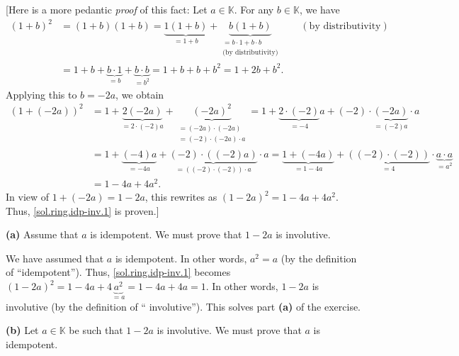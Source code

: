 \documentclass[paper=a4, fontsize=12pt]{scrartcl}%
\theoremstyle{plainsl}
\theoremstyle{definition}
\theoremstyle{remark}
\begin{document}
[Here is a more pedantic \textit{proof} of this fact: Let $a\in\mathbb{K}$.
For any $b\in\mathbb{K}$, we have%
\begin{align*}
\left(  1+b\right)  ^{2}  &  =\left(  1+b\right)  \left(  1+b\right)
=\underbrace{1\left(  1+b\right)  }_{=1+b}+\underbrace{b\left(  1+b\right)
}_{\substack{=b\cdot1+b\cdot b\\\text{(by distributivity)}}}\qquad\left(
\text{by distributivity}\right) \\
&  =1+b+\underbrace{b\cdot1}_{=b}+\underbrace{b\cdot b}_{=b^{2}}%
=1+b+b+b^{2}=1+2b+b^{2}.
\end{align*}
Applying this to $b=-2a$, we obtain%
\begin{align*}
\left(  1+\left(  -2a\right)  \right)  ^{2}  &  =1+\underbrace{2\left(
-2a\right)  }_{=2\cdot\left(  -2\right)  a}+\underbrace{\left(  -2a\right)
^{2}}_{\substack{=\left(  -2a\right)  \cdot\left(  -2a\right)  \\=\left(
-2\right)  \cdot\left(  -2a\right)  \cdot a}}=1+\underbrace{2\cdot\left(
-2\right)  }_{=-4}a+\left(  -2\right)  \cdot\underbrace{\left(  -2a\right)
}_{=\left(  -2\right)  a}\cdot a\\
&  =1+\underbrace{\left(  -4\right)  a}_{=-4a}+\underbrace{\left(  -2\right)
\cdot\left(  \left(  -2\right)  a\right)  }_{=\left(  \left(  -2\right)
\cdot\left(  -2\right)  \right)  \cdot a}\cdot a=\underbrace{1+\left(
-4a\right)  }_{=1-4a}+\underbrace{\left(  \left(  -2\right)  \cdot\left(
-2\right)  \right)  }_{=4}\cdot\underbrace{a\cdot a}_{=a^{2}}\\
&  =1-4a+4a^{2}.
\end{align*}
In view of $1+\left(  -2a\right)  =1-2a$, this rewrites as $\left(
1-2a\right)  ^{2}=1-4a+4a^{2}$. Thus, \eqref{sol.ring.idp-inv.1} is proven.]

\bigskip

\textbf{(a)} Assume that $a$ is idempotent. We must prove that $1-2a$ is involutive.

We have assumed that $a$ is idempotent. In other words, $a^{2}=a$ (by the
definition of \textquotedblleft idempotent\textquotedblright). Thus,
\eqref{sol.ring.idp-inv.1} becomes $\left(  1-2a\right)  ^{2}%
=1-4a+4\underbrace{a^{2}}_{=a}=1-4a+4a=1$. In other words, $1-2a$ is
involutive (by the definition of \textquotedblleft
involutive\textquotedblright). This solves part \textbf{(a)} of the exercise.

\bigskip

\textbf{(b)} Let $a\in\mathbb{K}$ be such that $1-2a$ is involutive. We must
prove that $a$ is idempotent.
\end{document}
